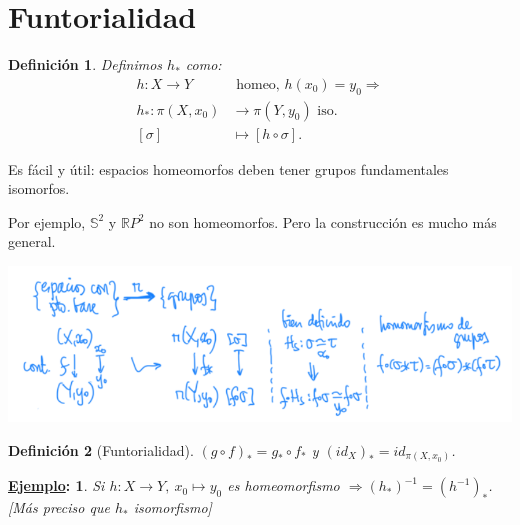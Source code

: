 \documentclass[10pt,a4paper,openright]{book}
\theoremstyle{break}
\newtheorem*{defi}{Definición}
\newtheorem*{ej}{\underline{Ejemplo}:}
\begin{document}
\section{Funtorialidad}%
\label{sec:funtorialidad}
\begin{defi}    
Definimos $h_*$ como:
\begin{align*}
    h: X \rightarrow Y &\text{ homeo, } h\left( x_0 \right) = y_0 \Rightarrow\\
    h_*: \pi\left( X, x_0 \right) &\rightarrow \pi\left( Y, y_0 \right) \text{ iso.}\\
    \left[ \sigma \right] &\mapsto \left[ h \circ \sigma \right] 
.\end{align*}
\end{defi}
Es fácil y útil: espacios homeomorfos deben tener grupos fundamentales isomorfos.

Por ejemplo, $\mathbb{S}^2$ y $\mathbb{R}P^2$ no son homeomorfos. Pero la construcción es mucho más general.
\begin{center}
    \includegraphics[scale=0.3]{images/const_functorialidad} 
\end{center}

\begin{defi}[Funtorialidad]
$\left( g \circ f \right)_* = g_* \circ f_*$ y $\left( id_X \right)_* = id_{\pi\left( X, x_0 \right)}$. 
\end{defi}

\begin{ej}
    Si $h: X \rightarrow Y,\ x_0 \mapsto y_0$ es homeomorfismo $\Rightarrow \left( h_* \right)^{-1} = \left( h^{-1} \right)_*$. [Más preciso que $h_*$ isomorfismo]
\end{ej}
\end{document}
